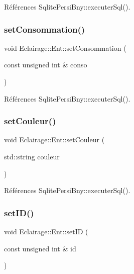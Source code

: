 Références Sqlite\+Persi\+Bny\+::executer\+Sql().

\mbox{\label{classEclairage_1_1Ent_a64c03bcbe84186341b0d9f23e91cdfd8}} 
\subsubsection{\texorpdfstring{set\+Consommation()}{setConsommation()}}
{\footnotesize\ttfamily void Eclairage\+::\+Ent\+::set\+Consommation (\begin{DoxyParamCaption}\item[{const unsigned int \&}]{conso }\end{DoxyParamCaption})\hspace{0.3cm}{\ttfamily [virtual]}}



Références Sqlite\+Persi\+Bny\+::executer\+Sql().

\mbox{\label{classEclairage_1_1Ent_a4cf307c89bd19221aa2cd338fa2eef7d}} 
\subsubsection{\texorpdfstring{set\+Couleur()}{setCouleur()}}
{\footnotesize\ttfamily void Eclairage\+::\+Ent\+::set\+Couleur (\begin{DoxyParamCaption}\item[{std\+::string}]{couleur }\end{DoxyParamCaption})\hspace{0.3cm}{\ttfamily [virtual]}}



Références Sqlite\+Persi\+Bny\+::executer\+Sql().

\mbox{\label{classEclairage_1_1Ent_a927ff132e908bb3e68dab254f6c2ac2d}} 
\subsubsection{\texorpdfstring{set\+I\+D()}{setID()}}
{\footnotesize\ttfamily void Eclairage\+::\+Ent\+::set\+ID (\begin{DoxyParamCaption}\item[{const unsigned int \&}]{id }\end{DoxyParamCaption})\hspace{0.3cm}{\ttfamily [virtual]}}



